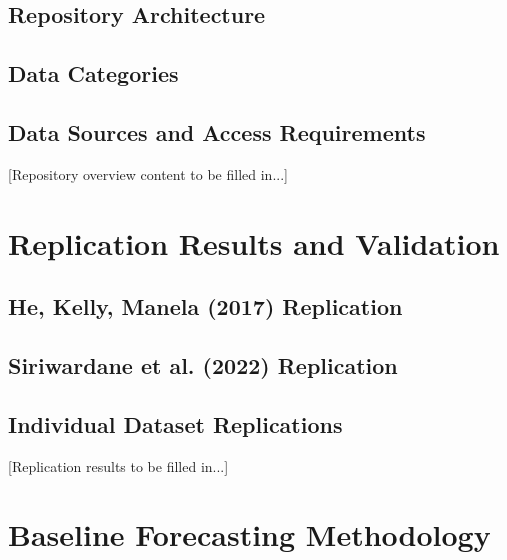 \documentclass{article}
\begin{document}
\subsection{Repository Architecture}

\subsection{Data Categories}

\subsection{Data Sources and Access Requirements}

[Repository overview content to be filled in...]

\section{Replication Results and Validation}
\label{sec:replication}


\subsection{He, Kelly, Manela (2017) Replication}

\subsection{Siriwardane et al. (2022) Replication}

\subsection{Individual Dataset Replications}

[Replication results to be filled in...]

\section{Baseline Forecasting Methodology}
\label{sec:methodology}
\end{document}
